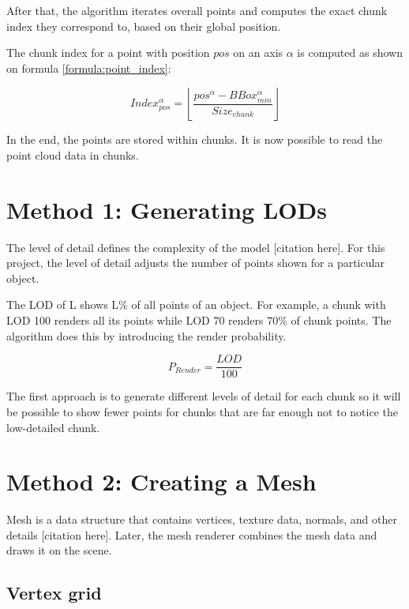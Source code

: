 After that, the algorithm iterates overall points and computes the exact chunk index they correspond to, based on their global position.

The chunk index for a point with position $pos$ on an axis $\alpha$ is computed as shown on formula \ref{formula:point_index}:

\begin{equation}
\label{formula:point_index}
Index_{pos}^\alpha = \left \lfloor \frac{pos^{\alpha} - BBox_{min}^\alpha}{Size_{chunk}} \right \rfloor
\end{equation}

In the end, the points are stored within chunks. It is now possible to read the point cloud data in chunks.


\section{Method 1: Generating LODs}
\label{sec:generating_lods}

The level of detail defines the complexity of the model [citation here]. For this project, the level of detail adjusts the number of points shown for a particular object.

The LOD of L shows L\% of all points of an object. For example, a chunk with LOD 100 renders all its points while LOD 70 renders 70\% of chunk points. The algorithm does this by introducing the render probability.

\begin{equation}
\label{formula:render_probability}
P_{Render} = \frac{LOD}{100}
\end{equation}

The first approach is to generate different levels of detail for each chunk so it will be possible to show fewer points for chunks that are far enough not to notice the low-detailed chunk.

\newpage

\section{Method 2: Creating a Mesh}
\label{sec:creating_mesh}

Mesh is a data structure that contains vertices, texture data, normals, and other details [citation here]. Later, the mesh renderer combines the mesh data and draws it on the scene.


\subsection{Vertex grid}
\label{subsec:vertex_grid}

